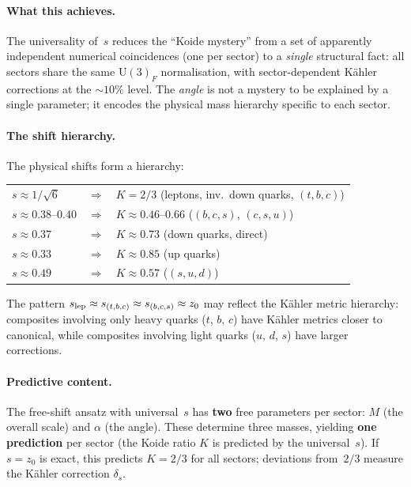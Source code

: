 \documentclass[preprint,12pt]{elsarticle}
\newcommand{\UU}{\mathrm{U}}
\begin{document}
\paragraph{What this achieves.}
The universality of~$s$ reduces the ``Koide mystery''
from a set of apparently independent numerical coincidences
(one per sector) to a \emph{single} structural fact: all
sectors share the same $\UU(3)_F$ normalisation, with
sector-dependent K\"ahler corrections at the $\sim 10\%$ level.
The \emph{angle} is not a mystery to be explained by a
single parameter; it encodes the physical mass hierarchy
specific to each sector.

\paragraph{The shift hierarchy.}
The physical shifts form a hierarchy:
\begin{center}
\begin{tabular}{lcl}
$s \approx 1/\sqrt{6}$ & $\Rightarrow$ & $K = 2/3$ (leptons, inv.\ down quarks, $(t,b,c)$) \\
$s \approx 0.38$--$0.40$ & $\Rightarrow$ & $K \approx 0.46$--$0.66$ ($(b,c,s)$, $(c,s,u)$) \\
$s \approx 0.37$        & $\Rightarrow$ & $K \approx 0.73$ (down quarks, direct) \\
$s \approx 0.33$        & $\Rightarrow$ & $K \approx 0.85$ (up quarks) \\
$s \approx 0.49$        & $\Rightarrow$ & $K \approx 0.57$ ($(s,u,d)$) \\
\end{tabular}
\end{center}
The pattern $s_{\rm lep} \approx s_{(t,b,c)} \approx s_{(b,c,s)}
\approx z_0$ may reflect
the K\"ahler metric hierarchy:
composites involving only heavy quarks ($t$, $b$, $c$) have
K\"ahler metrics closer to canonical, while composites involving
light quarks ($u$, $d$, $s$) have larger corrections.

\paragraph{Predictive content.}
The free-shift ansatz with universal~$s$ has
\textbf{two} free parameters per sector:
$M$ (the overall scale) and $\alpha$ (the angle).
These determine three masses, yielding \textbf{one prediction}
per sector (the Koide ratio $K$ is predicted by the universal~$s$).
If $s = z_0$ is exact, this predicts $K = 2/3$ for all sectors;
deviations from~$2/3$ measure the K\"ahler correction $\delta_s$.
\end{document}
